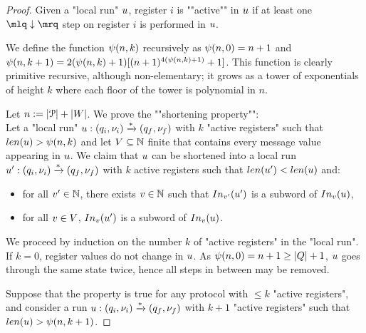 \begin{proof}
	Given a "local run" $u$, register $i$ is ""active"" in $u$ if at least one $\quotemarks{\enregact}$ step on register $i$ is performed in $u$. 
	
	We define the function $\psi(n,k)$ recursively as $\psi(n,0) = n+1$ and $\psi(n,k+1) = 2(\psi(n,k) +1) [(n+1)^{4(\psi(n,k)+1)} +1]$. This function is clearly primitive recursive, although non-elementary; it grows as a tower of exponentials of height $k$ where each floor of the tower is polynomial in $n$.
	
	Let $n:=|\mathcal{P}| + |W|$.
	We prove the ""shortening property"": \\
	Let a "local run" $u: (q_i, \nu_i) \xrightarrow{*} (q_f, \nu_f)$ with $k$ "active registers" such that $\length{\localrun} > \towerfun(n,k)$ and let $V \subseteq \mathbb{N}$ finite that contains every message value appearing in $u$. We claim that $u$ can be shortened into a local run $u': (q_i, \nu_i) \xrightarrow{*} (q_f, \nu_f)$ with $k$ active registers such that $\length{\localrun'} < \length{\localrun}$ and:
	\begin{itemize}
		\item for all $v' \in \mathbb{N}$, there exists $v \in \mathbb{N}$ such that $\vinput{\aval'}{\localrun'}$ is a subword of $\vinput{\aval}{\localrun}$,
		\item for all $v \in V$, $\vinput{\aval}{\localrun'}$ is a subword of $\vinput{\aval}{\localrun}$. 
	\end{itemize}
	
	We proceed by induction on the number $k$ of "active registers" in the "local run". If $k=0$, register values do not change in $u$. As $\psi(n,0) = n+1 \geq |Q|+1$, $u$ goes through the same state twice, hence all steps in between may be removed. 
	
	Suppose that the property is true for any protocol with $\leq k$ "active registers", and consider a run $u: (q_i,\nu_i) \xrightarrow{*} (q_f,\nu_f)$ with $k+1$ "active registers" such that $\length{\localrun} > \towerfun(n,k+1)$.
	

\end{proof}
